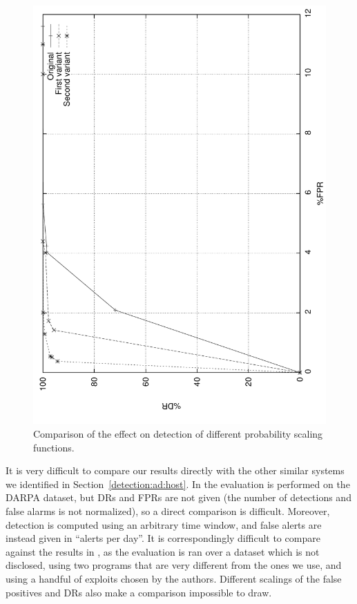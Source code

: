 \begin{figure}[t]
  \centering
  \includegraphics[angle=-90,width=\textwidth]{figures/host/syscall/roc}
  \caption{Comparison of the effect on detection of different probability scaling functions.}
  \label{fig:scaling_comparison}
\end{figure}

It is very difficult to compare our results directly with the other
similar systems we identified in Section~\ref{detection:ad:host}. In
\citep{rulessystemcallarguments} the evaluation is performed on the
\ac{DARPA} dataset, but \acp{DR} and
\acp{FPR} are not given (the number of detections and false
alarms is not normalized), so a direct comparison is
difficult. Moreover, detection is computed using an arbitrary time
window, and false alerts are instead given in ``alerts per day''.  It
is correspondingly difficult to compare against the results in
\citep{venkat_dataflow}, as the evaluation is ran over a dataset which
is not disclosed, using two programs that are very different from the
ones we use, and using a handful of exploits chosen by the
authors. Different scalings of the false positives and
\acp{DR} also make a comparison impossible to draw.

